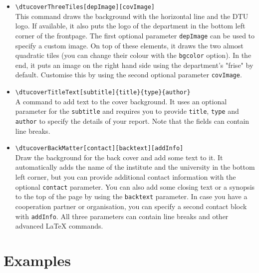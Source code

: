 \documentclass[b5paper]{article}
\begin{document}
\begin{itemize}
\item \texttt{\textbackslash dtucoverThreeTiles[depImage][covImage]} \\
      This command draws the background with the horizontal line and the DTU logo. If available, it also puts the logo of the 
      department in the bottom left corner of the frontpage. The first optional parameter \texttt{depImage} can be used to 
      specify a custom image. On top of these elements, it draws the two almost quadratic tiles 
      (you can change their colour with the \texttt{bgcolor} option). In the end, it puts an image on the right hand side using 
      the department's "frise" by default. Customise this by using the second optional parameter \texttt{covImage}.
\item \texttt{\textbackslash dtucoverTitleText[subtitle]\{title\}\{type\}\{author\}} \\
      A command to add text to the cover background. It uses an optional parameter for the \texttt{subtitle} and 
      requires you to provide \texttt{title}, \texttt{type} and \texttt{author} to specify the details of your report. Note that
      the fields can contain line breaks.
\item \texttt{\textbackslash dtucoverBackMatter[contact][backtext][addInfo]} \\ 
      Draw the background for the back cover and add some text to it. It automatically adds the name of the institute and the 
      university in the bottom left corner, but you can provide additional contact information with the optional \texttt{contact}
      parameter. You can also add some closing text or a synopsis to the top of the page by using the \texttt{backtext} parameter.
      In case you have a cooperation partner or organisation, you can specify a second contact block with \texttt{addInfo}. All 
      three parameters can contain line breaks and other advanced \LaTeX{} commands.
\end{itemize}

\section{Examples}
\end{document}
